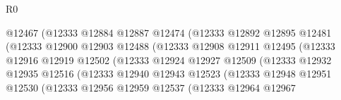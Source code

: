 \begin{lexlean}{R0}
\begin{coremodule}
                                          @12467
                                          (@12333
                                            @12884
                                            @12887
                                            @12474
                                            (@12333
                                              @12892
                                              @12895
                                              @12481
                                              (@12333
                                                @12900
                                                @12903
                                                @12488
                                                (@12333
                                                  @12908
                                                  @12911
                                                  @12495
                                                  (@12333
                                                    @12916
                                                    @12919
                                                    @12502
                                                    (@12333
                                                      @12924
                                                      @12927
                                                      @12509
                                                      (@12333
                                                        @12932
                                                        @12935
                                                        @12516
                                                        (@12333
                                                          @12940
                                                          @12943
                                                          @12523
                                                          (@12333
                                                            @12948
                                                            @12951
                                                            @12530
                                                            (@12333
                                                              @12956
                                                              @12959
                                                              @12537
                                                              (@12333
                                                                @12964
                                                                @12967

\end{coremodule}
\end{lexlean}
